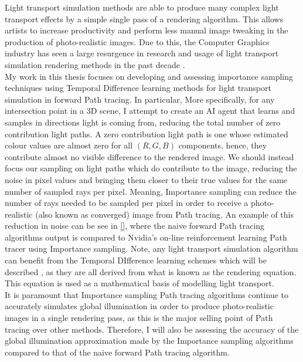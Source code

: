 \documentclass[ %
                    author={Callum Pearce},
                supervisor={Dr. Neill Campbell},
                    degree={MEng},
                     title={How effective are Temporal difference learning methods for reducing the number of zero contribution light paths while still accurately approximating Global Illumination in Path tracing?},
                  subtitle={},
                      type={research},
                      year={2019} ]{dissertation}
\begin{document}

Light transport simulation methods are able to produce 
many complex light transport effects by a simple single pass of a rendering algorithm.
This allows artists to increase productivity and perform less manual image tweaking
in the production of photo-realistic images. Due to this, the Computer Graphics 
industry has seen a large resurgence in research and usage of light transport simulation 
rendering methods in the past decade \cite{krivanek2014recent}. \\

My work in this thesis focuses on developing and assessing importance sampling 
techniques using Temporal Difference learning methods for light transport simulation 
in forward Path tracing. In particular, More specifically,
for any intersection point in a 3D scene, I attempt to create an AI agent that learns 
and samples in  directions light is coming from, reducing the total number of 
zero contribution light paths. A zero contribution light path is one whose 
estimated colour values are almost zero for all $(R,G,B)$ components, hence,
they contribute almost no visible difference to the rendered image. We should 
instead focus our sampling on light paths which do contribute to the image,
reducing the noise in pixel values and bringing them closer to their true 
values for the same number of sampled rays per pixel. Meaning, Importance 
sampling can reduce the number of rays needed to be sampled per pixel in 
order to receive a photo-realistic (also known as converged) image from Path 
tracing. An example of this reduction in noise can be see in \ref{}, where the 
naive forward Path tracing algorithms output is compared to Nvidia's on-line
reinforcement learning Path tracer using Importance sampling. Note, any 
light transport simulation algorithm can benefit from the Temporal DIfference learning
schemes which will be described \cite{jensen1996global, keller2016path}, 
as they are all derived from what is known as the rendering equation. This equation
is used as a mathematical basis of modelling light transport.\\


It is paramount that Importance sampling Path tracing algorithms continue to accurately
simulates global illumination in order to produce photo-realistic images in a single
rendering pass, as this is the major selling point of Path tracing over other 
methods. Therefore, I will also be assessing the accuracy of the global
illumination approximation made by the Importance sampling algorithms compared
to that of the naive forward Path tracing algorithm.
\end{document}
